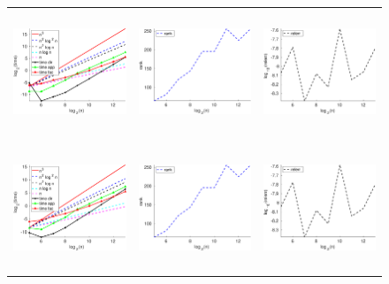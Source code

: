 \documentclass[11pt]{article}
\begin{document}
    \begin{figure}
  \begin{center}
    \begin{tabular}{ccc}
      \includegraphics[height=1.45in]{pic/testJPT2D_time.eps}&
      \includegraphics[height=1.45in]{pic/testJPT2D_rank.eps}&
      \includegraphics[height=1.45in]{pic/testJPT2D_err.eps}\\
      \\
      \includegraphics[height=1.45in]{pic/testinvJPT2D_time.eps}&
      \includegraphics[height=1.45in]{pic/testinvJPT2D_rank.eps}&
      \includegraphics[height=1.45in]{pic/testinvJPT2D_err.eps}\\

\end{tabular}
\end{center}
\end{figure}
\end{document}

